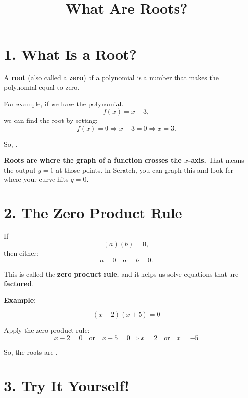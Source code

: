 \documentclass[12pt]{article}
\title{\vspace{-2cm}What Are Roots?}
\author{}
\date{}
\begin{document}
\maketitle

\section*{1. What Is a Root?}

A \textbf{root} (also called a \textbf{zero}) of a polynomial is a number that makes the polynomial equal to zero.

\bigskip

For example, if we have the polynomial:
\[
f(x) = x - 3,
\]
we can find the root by setting:
\[
f(x) = 0 \Rightarrow x - 3 = 0 \Rightarrow x = 3.
\]

So, .

\bigskip

\textbf{Roots are where the graph of a function crosses the $x$-axis.} That means the output $y = 0$ at those points. In Scratch, you can graph this and look for where your curve hits $y = 0$.

\vspace{0.5cm}

\section*{2. The Zero Product Rule}

If
\[
(a)(b) = 0,
\]
then either:
\[
a = 0 \quad \text{or} \quad b = 0.
\]

This is called the \textbf{zero product rule}, and it helps us solve equations that are \textbf{factored}.

\bigskip

\textbf{Example:}

\[
(x - 2)(x + 5) = 0
\]

Apply the zero product rule:
\[
x - 2 = 0 \quad \text{or} \quad x + 5 = 0
\Rightarrow x = 2 \quad \text{or} \quad x = -5
\]

So, the roots are .

\bigskip

\section*{3. Try It Yourself!}
\end{document}
